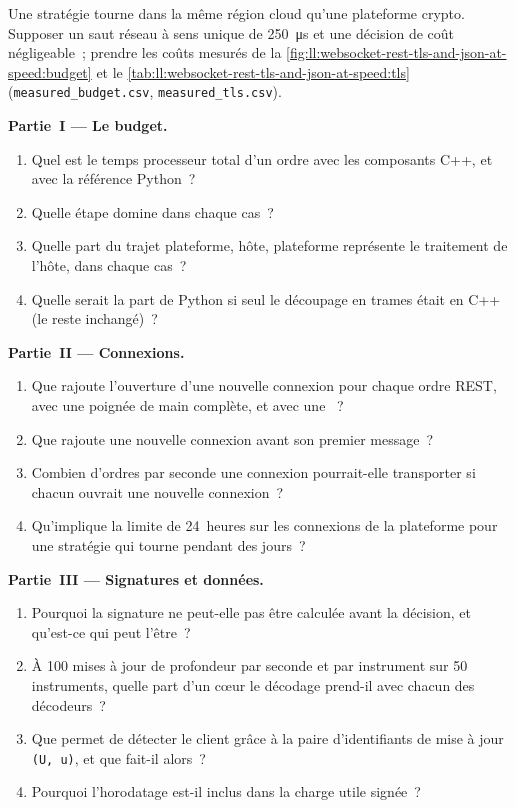 \begin{problem}\label{pb:ll:websocket-rest-tls-and-json-at-speed:1}
Une stratégie tourne dans la même région cloud qu'une plateforme crypto. Supposer un saut réseau à sens unique de \qty{250}{\micro\second} et une
décision de coût négligeable~; prendre les coûts mesurés de la \cref{fig:ll:websocket-rest-tls-and-json-at-speed:budget} et le
\cref{tab:ll:websocket-rest-tls-and-json-at-speed:tls} (\texttt{measured\_budget.csv}, \texttt{measured\_tls.csv}).

\medskip\noindent\textbf{Partie~I --- Le budget.}
\begin{enumerate}
\item Quel est le temps processeur total d'un ordre avec les composants C++, et avec la référence Python~?
\item Quelle étape domine dans chaque cas~?
\item Quelle part du trajet plateforme, hôte, plateforme représente le traitement de l'hôte, dans chaque cas~?
\item Quelle serait la part de Python si seul le découpage en trames était en C++ (le reste inchangé)~?
\end{enumerate}

\medskip\noindent\textbf{Partie~II --- Connexions.}
\begin{enumerate}[resume]
\item Que rajoute l'ouverture d'une nouvelle connexion pour chaque ordre REST, avec une poignée de main complète, et avec une ~?
\item Que rajoute une nouvelle connexion  avant son premier message~?
\item Combien d'ordres par seconde une connexion pourrait-elle transporter si chacun ouvrait une nouvelle connexion~?
\item Qu'implique la limite de 24~heures sur les connexions de la plateforme pour une stratégie qui tourne pendant des jours~?
\end{enumerate}

\medskip\noindent\textbf{Partie~III --- Signatures et données.}
\begin{enumerate}[resume]
\item Pourquoi la signature ne peut-elle pas être calculée avant la décision, et qu'est-ce qui peut l'être~?
\item À 100 mises à jour de profondeur par seconde et par instrument sur 50 instruments, quelle part d'un cœur le décodage prend-il avec chacun des
décodeurs~?
\item Que permet de détecter le client grâce à la paire d'identifiants de mise à jour \texttt{(U, u)}, et que fait-il alors~?
\item Pourquoi l'horodatage est-il inclus dans la charge utile signée~?
\end{enumerate}


\end{problem}
